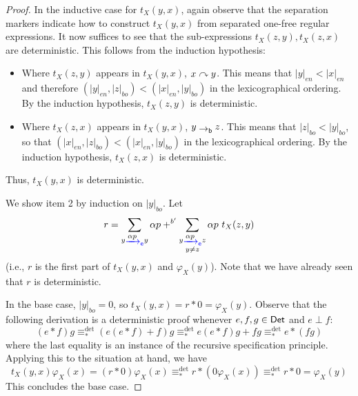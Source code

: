 \documentclass[orivec,envcountsect,envcountsame]{llncs}
\begin{document}
\begin{proof}
	In the inductive case for \(t_X(y, x)\), again observe that the separation markers indicate how to construct \(t_X(y, x)\) from separated one-free regular expressions.
	It now suffices to see that the sub-expressions \(t_X(z,y),t_X(z,x)\) are deterministic.
	This follows from the induction hypothesis:
	\begin{itemize}
		\item Where \(t_X(z,y)\) appears in \(t_X(y,x)\), \(x \mathrel{\curvearrowright} y\).
		This means that \(|y|_{en} < |x|_{en}\) and therefore \((|y|_{en}, |z|_{bo}) < (|x|_{en}, |y|_{bo})\) in the lexicographical ordering.
		By the induction hypothesis, \(t_X(z, y)\) is deterministic.
		\item Where \(t_X(z,x)\) appears in \(t_X(y,x)\), \(y \bo z\).
		This means that \(|z|_{bo} < |y|_{bo}\), so that \((|x|_{en}, |z|_{bo}) < (|x|_{en}, |y|_{bo})\) in the lexicographical ordering.
		By the induction hypothesis, \(t_X(z,x)\) is deterministic.
	\end{itemize}
	Thus, \(t_X(y, x)\) is deterministic.

	We show item 2 by induction on \(|y|_{bo}\).
	Let
	\[
	r = \sum_{y \etr{\alpha p} y} \alpha p
	+^{b'} \sum_{\substack{y \etr{\alpha p} z \\ y \neq z}} \alpha p~t_X(z, y)
	\]
	(i.e., $r$ is the first part of $t_X(y, x)$ and $\varphi_X(y)$).
	Note that we have already seen that \(r\) is deterministic.

	In the base case, \(|y|_{bo} = 0\), so \(t_X(y,x) = r*0 = \varphi_X(y)\).
	Observe that the following derivation is a deterministic proof whenever \(e,f,g \in \mathsf{Det}\) and \(e \perp f\):
	\begin{equation}
		\label{eq:star assoc det}
		(e * f)g
		\equiv_*^{\det} (e(e * f) + f)g
		\equiv_*^{\det} e(e * f)g + fg
		\equiv_*^{\det} e * (fg)
	\end{equation}
	where the last equality is an instance of the recursive specification principle.
	Applying this to the situation at hand, we have \[
	t_X(y,x) \varphi_X(x)
    = (r*0)\varphi_X(x)
	\equiv_*^{\det} r * (0 \varphi_X(x))
	\equiv_*^{\det} r * 0
	= \varphi_X(y)
	\]
	This concludes the base case.


\end{proof}
\end{document}
